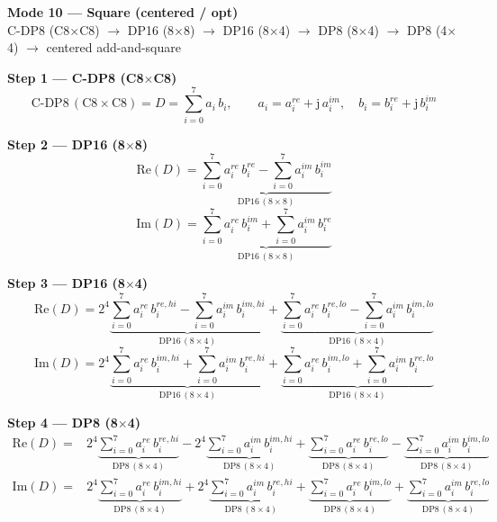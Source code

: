 \documentclass[fleqn]{article}
\newcommand{\DPop}[3]{\mathrm{DP#1}\,(#2\!\times\!#3)}
\begin{document}
\begin{center}
{\LARGE \textbf{Mode 10 --- Square (centered / opt)}}\\[4pt]
{\large C-DP8 (C8$\times$C8) $\rightarrow$ DP16 (8$\times$8) $\rightarrow$ DP16 (8$\times$4) $\rightarrow$ DP8 (8$\times$4) $\rightarrow$ DP8 (4$\times$4) $\rightarrow$ centered add-and-square}
\end{center}

\vspace{0.1em}

\textbf{Step 1 --- C-DP8 (C8$\times$C8)}
\[
\text{C-DP8}\,(\mathrm{C8}\!\times\!\mathrm{C8}) = D = \sum_{i=0}^{7} a_i \, b_i, \qquad
a_i = a_i^{re} + \mathrm{j}\,a_i^{im}, \quad
b_i = b_i^{re} + \mathrm{j}\,b_i^{im}
\]

\textbf{Step 2 --- DP16 (8$\times$8)}
\[
\mathrm{Re}(D) = \underbrace{\sum_{i=0}^{7} a_i^{re}\, b_i^{re}
  - \sum_{i=0}^{7} a_i^{im}\, b_i^{im}}_{\DPop{16}{8}{8}}
\]
\[
\mathrm{Im}(D) = \underbrace{\sum_{i=0}^{7} a_i^{re}\, b_i^{im}
  + \sum_{i=0}^{7} a_i^{im}\, b_i^{re}}_{\DPop{16}{8}{8}}
\]

\textbf{Step 3 --- DP16 (8$\times$4)}
\[
\mathrm{Re}(D) = 2^{4}\underbrace{\sum_{i=0}^{7} a_i^{re}\, b_i^{re,hi}
  - \sum_{i=0}^{7} a_i^{im}\, b_i^{im,hi}}_{\DPop{16}{8}{4}}
  + \underbrace{\sum_{i=0}^{7} a_i^{re}\, b_i^{re,lo}
  - \sum_{i=0}^{7} a_i^{im}\, b_i^{im,lo}}_{\DPop{16}{8}{4}}
\]
\[
\mathrm{Im}(D) = 2^{4}\underbrace{\sum_{i=0}^{7} a_i^{re}\, b_i^{im,hi}
  + \sum_{i=0}^{7} a_i^{im}\, b_i^{re,hi}}_{\DPop{16}{8}{4}}
  + \underbrace{\sum_{i=0}^{7} a_i^{re}\, b_i^{im,lo}
  + \sum_{i=0}^{7} a_i^{im}\, b_i^{re,lo}}_{\DPop{16}{8}{4}}
\]

\textbf{Step 4 --- DP8 (8$\times$4)}
\begin{align*}
\mathrm{Re}(D) = {}
  & 2^{4}\underbrace{\sum_{i=0}^{7} a_i^{re}\, b_i^{re,hi}}_{\DPop{8}{8}{4}}
  - 2^{4}\underbrace{\sum_{i=0}^{7} a_i^{im}\, b_i^{im,hi}}_{\DPop{8}{8}{4}}
  + \underbrace{\sum_{i=0}^{7} a_i^{re}\, b_i^{re,lo}}_{\DPop{8}{8}{4}}
  - \underbrace{\sum_{i=0}^{7} a_i^{im}\, b_i^{im,lo}}_{\DPop{8}{8}{4}}
\end{align*}
\begin{align*}
\mathrm{Im}(D) = {}
  & 2^{4}\underbrace{\sum_{i=0}^{7} a_i^{re}\, b_i^{im,hi}}_{\DPop{8}{8}{4}}
  + 2^{4}\underbrace{\sum_{i=0}^{7} a_i^{im}\, b_i^{re,hi}}_{\DPop{8}{8}{4}}
  + \underbrace{\sum_{i=0}^{7} a_i^{re}\, b_i^{im,lo}}_{\DPop{8}{8}{4}}
  + \underbrace{\sum_{i=0}^{7} a_i^{im}\, b_i^{re,lo}}_{\DPop{8}{8}{4}}
\end{align*}
\end{document}
